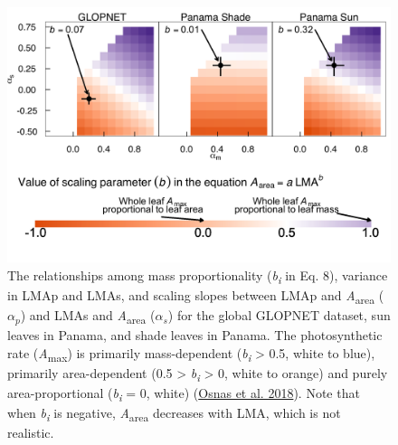 \documentclass[
  12pt,
  a4paper,
,tablecaptionabove
]{scrartcl}
\begin{document}
\begin{figure}
\hypertarget{fig:massplt}{%
\centering
\includegraphics{../figs/mass_prop4.png}
\caption{The relationships among mass proportionality (\emph{b\textsubscript{i}} in Eq. 8), variance in LMAp and LMAs, and scaling slopes between LMAp and \emph{A}\textsubscript{area} (\(\alpha_p\)) and LMAs and \emph{A}\textsubscript{area} (\(\alpha_s\)) for the global GLOPNET dataset, sun leaves in Panama, and shade leaves in Panama.
The photosynthetic rate (\emph{A}\textsubscript{max}) is primarily mass-dependent (\emph{b\textsubscript{i}} \textgreater{} 0.5, white to blue), primarily area-dependent (0.5 \textgreater{} \emph{b\textsubscript{i}} \textgreater{} 0, white to orange) and purely area-proportional (\emph{b\textsubscript{i}} = 0, white) (\protect\hyperlink{ref-Osnas2018}{Osnas et al. 2018}).
Note that when \emph{b\textsubscript{i}} is negative, \emph{A}\textsubscript{area} decreases with LMA, which is not realistic.}\label{fig:massplt}
}
\end{figure}

\newpage
\end{document}
